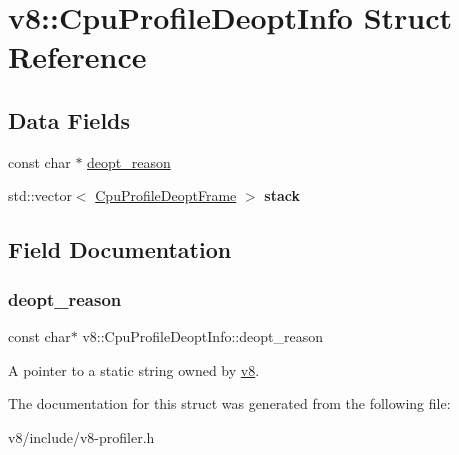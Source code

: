 \hypertarget{structv8_1_1CpuProfileDeoptInfo}{}\section{v8\+:\+:Cpu\+Profile\+Deopt\+Info Struct Reference}
\label{structv8_1_1CpuProfileDeoptInfo}
\subsection*{Data Fields}
\begin{DoxyCompactItemize}
\item 
const char $\ast$ \mbox{\hyperlink{structv8_1_1CpuProfileDeoptInfo_a908eb3ba33b47ace8973eeb2fda96ca9}{deopt\+\_\+reason}}
\item 
\mbox{\label{structv8_1_1CpuProfileDeoptInfo_a9446493c0e0a00e3ada02ba8df858d42}} 
std\+::vector$<$ \mbox{\hyperlink{structv8_1_1CpuProfileDeoptFrame}{Cpu\+Profile\+Deopt\+Frame}} $>$ {\bfseries stack}
\end{DoxyCompactItemize}


\subsection{Field Documentation}
\mbox{\label{structv8_1_1CpuProfileDeoptInfo_a908eb3ba33b47ace8973eeb2fda96ca9}} 
\subsubsection{\texorpdfstring{deopt\+\_\+reason}{deopt\_reason}}
{\footnotesize\ttfamily const char$\ast$ v8\+::\+Cpu\+Profile\+Deopt\+Info\+::deopt\+\_\+reason}

A pointer to a static string owned by \mbox{\hyperlink{namespacev8}{v8}}. 

The documentation for this struct was generated from the following file\+:\begin{DoxyCompactItemize}
\item 
v8/include/v8-\/profiler.\+h\end{DoxyCompactItemize}
